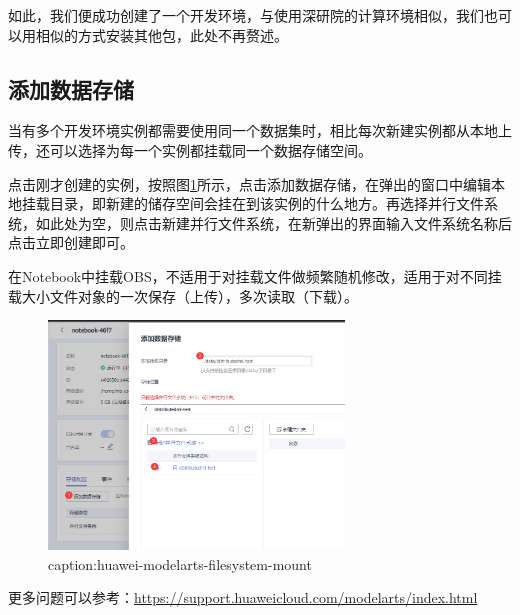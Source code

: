 如此，我们便成功创建了一个开发环境，与使用深研院的计算环境相似，我们也可以用相似的方式安装其他包，此处不再赘述。

\subsection{添加数据存储}

当有多个开发环境实例都需要使用同一个数据集时，相比每次新建实例都从本地上传，还可以选择为每一个实例都挂载同一个数据存储空间。

点击刚才创建的实例，按照图\ref{fig:huawei-modelarts-filesystem-mount}所示，点击添加数据存储，在弹出的窗口中编辑本地挂载目录，即新建的储存空间会挂在到该实例的什么地方。再选择并行文件系统，如此处为空，则点击新建并行文件系统，在新弹出的界面输入文件系统名称后点击立即创建即可。

在Notebook中挂载OBS，不适用于对挂载文件做频繁随机修改，适用于对不同挂载大小文件对象的一次保存（上传），多次读取（下载）。

\begin{figure}[htbp]
	\centering
	\includegraphics[width=0.7\textwidth]{figures/huawei-modelarts-filesystem-mount.png}
	\caption{caption:huawei-modelarts-filesystem-mount}
	\label{fig:huawei-modelarts-filesystem-mount}
\end{figure}

\vspace{3em}
更多问题可以参考：\url{https://support.huaweicloud.com/modelarts/index.html}